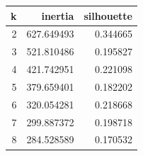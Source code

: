 \begin{tabular}{rrr}
\toprule
k & inertia & silhouette \\
\midrule
2 & 627.649493 & 0.344665 \\
3 & 521.810486 & 0.195827 \\
4 & 421.742951 & 0.221098 \\
5 & 379.659401 & 0.182202 \\
6 & 320.054281 & 0.218668 \\
7 & 299.887372 & 0.198718 \\
8 & 284.528589 & 0.170532 \\
\bottomrule
\end{tabular}
